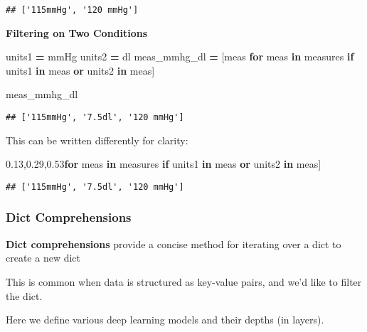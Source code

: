 \documentclass[
]{book}
\newenvironment{Shaded}{\begin{snugshade}}{\end{snugshade}}
\newcommand{\ControlFlowTok}[1]{\textcolor[rgb]{0.13,0.29,0.53}{\textbf{#1}}}
\newcommand{\KeywordTok}[1]{\textcolor[rgb]{0.13,0.29,0.53}{\textbf{#1}}}
\newcommand{\NormalTok}[1]{#1}
\newcommand{\OperatorTok}[1]{\textcolor[rgb]{0.81,0.36,0.00}{\textbf{#1}}}
\newcommand{\StringTok}[1]{\textcolor[rgb]{0.31,0.60,0.02}{#1}}
\begin{document}
\begin{verbatim}
## ['115mmHg', '120 mmHg']
\end{verbatim}

\textbf{Filtering on Two Conditions}

\begin{Shaded}
\begin{Highlighting}[]
\NormalTok{units1 }\OperatorTok{=} \StringTok{\textquotesingle{}mmHg\textquotesingle{}}
\NormalTok{units2 }\OperatorTok{=} \StringTok{\textquotesingle{}dl\textquotesingle{}}
\NormalTok{meas\_mmhg\_dl }\OperatorTok{=}\NormalTok{ [meas }\ControlFlowTok{for}\NormalTok{ meas }\KeywordTok{in}\NormalTok{ measures }\ControlFlowTok{if}\NormalTok{ units1 }\KeywordTok{in}\NormalTok{ meas }\KeywordTok{or}\NormalTok{ units2 }\KeywordTok{in}\NormalTok{ meas]}

\NormalTok{meas\_mmhg\_dl}
\end{Highlighting}
\end{Shaded}

\begin{verbatim}
## ['115mmHg', '7.5dl', '120 mmHg']
\end{verbatim}

This can be written differently for clarity:

\begin{Shaded}
\begin{Highlighting}[]
\NormalTok{[meas }
 \ControlFlowTok{for}\NormalTok{ meas }\KeywordTok{in}\NormalTok{ measures }
 \ControlFlowTok{if}\NormalTok{ units1 }\KeywordTok{in}\NormalTok{ meas }
 \KeywordTok{or}\NormalTok{ units2 }\KeywordTok{in}\NormalTok{ meas]}
\end{Highlighting}
\end{Shaded}

\begin{verbatim}
## ['115mmHg', '7.5dl', '120 mmHg']
\end{verbatim}

\subsubsection{Dict Comprehensions}\label{dict-comprehensions}

\textbf{Dict comprehensions} provide a concise method for iterating over a dict to create a new dict

This is common when data is structured as key-value pairs, and we'd like to filter the dict.

Here we define various deep learning models and their depths (in layers).
\end{document}
